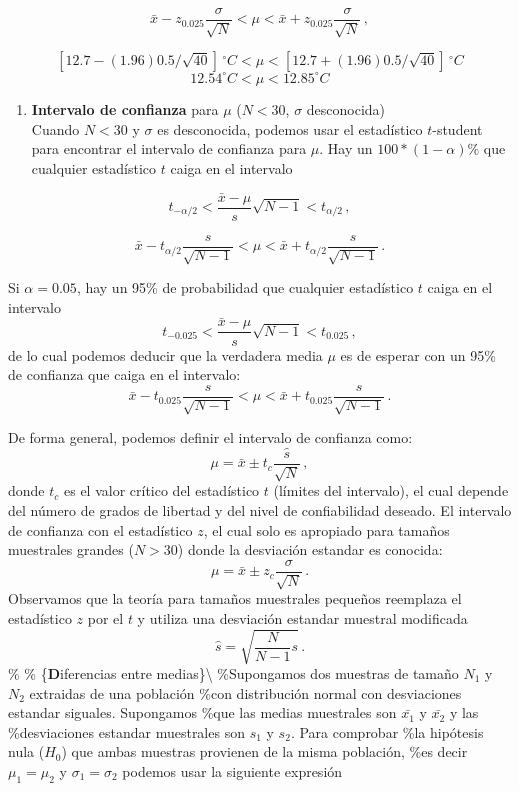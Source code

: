 \documentclass[
]{agujournal2019}
\providecommand{\tightlist}{%
  \setlength{\itemsep}{0pt}\setlength{\parskip}{0pt}}\usepackage{longtable,booktabs,array}
\begin{document}
\[\bar{x}-z_{0.025}\frac{\sigma}{\sqrt{N}}<\mu<\bar{x}+z_{0.025}\frac{\sigma}{\sqrt{N}}\,,\]

\[\left[12.7-(1.96)0.5/\sqrt{40}\right]\,^\circ{C}<\mu<\left[12.7+(1.96)0.5/\sqrt{40}\right]\,^\circ{C}\]
\[12.54^\circ{C} < \mu < 12.85^\circ{C}\]

\begin{enumerate}
\def\labelenumi{(\arabic{enumi})}
\setcounter{enumi}{1}
\tightlist
\item
  \textbf{Intervalo de confianza} para \(\mu\) (\(N<30\), \(\sigma\)
  desconocida)\\
  Cuando \(N<30\) y \(\sigma\) es desconocida, podemos usar el
  estadístico \(t\)-student para encontrar el intervalo de confianza
  para \(\mu\). Hay un \(100*(1-\alpha)\%\) que cualquier estadístico
  \(t\) caiga en el intervalo
\end{enumerate}

\[t_{-\alpha/2}<\frac{\bar{x}-\mu}{s}\sqrt{N-1}<t_{\alpha/2}\,,\]

\[\bar{x}-t_{\alpha/2}\frac{s}{\sqrt{N-1}} < \mu <
   \bar{x}+t_{\alpha/2}\frac{s}{\sqrt{N-1}}\,.\]

Si \(\alpha=0.05\), hay un 95\% de probabilidad que cualquier
estadístico \(t\) caiga en el intervalo
\[t_{-0.025}<\frac{\bar{x}-\mu}{s}\sqrt{N-1}<t_{0.025}\,,\] de lo cual
podemos deducir que la verdadera media \(\mu\) es de esperar con un 95\%
de confianza que caiga en el intervalo:
\[\bar{x}-t_{0.025}\frac{s}{\sqrt{N-1}}<\mu<\bar{x}+t_{0.025}\frac{s}{\sqrt{N-1}}\,.\]

De forma general, podemos definir el intervalo de confianza como:
\[\mu=\bar{x}\pm t_c\frac{\hat{s}}{\sqrt{N}}\,,\] donde \(t_c\) es el
valor crítico del estadístico \(t\) (límites del intervalo), el cual
depende del número de grados de libertad y del nivel de confiabilidad
deseado. El intervalo de confianza con el estadístico \(z\), el cual
solo es apropiado para tamaños muestrales grandes (\(N>30\)) donde la
desviación estandar es conocida:
\[\mu=\bar{x}\pm z_c\frac{\sigma}{\sqrt{N}}\,.\] Observamos que la
teoría para tamaños muestrales pequeños reemplaza el estadístico \(z\)
por el \(t\) y utiliza una desviación estandar muestral modificada
\[\hat{s}=\sqrt{\frac{N}{N-1}s}\,.\] \%\vspace{0.5cm} \%
\{\noindent \textbf Diferencias entre medias\}\textbackslash{}
\%Supongamos dos muestras de tamaño \(N_1\) y \(N_2\) extraidas de una
población \%con distribución normal con desviaciones estandar siguales.
Supongamos \%que las medias muestrales son \(\bar{x_1}\) y \(\bar{x_2}\)
y las \%desviaciones estandar muestrales son \(s_1\) y \(s_2\). Para
comprobar \%la hipótesis nula (\(H_0\)) que ambas muestras provienen de
la misma población, \%es decir \(\mu_1=\mu_2\) y \(\sigma_1=\sigma_2\)
podemos usar la siguiente expresión
\end{document}
